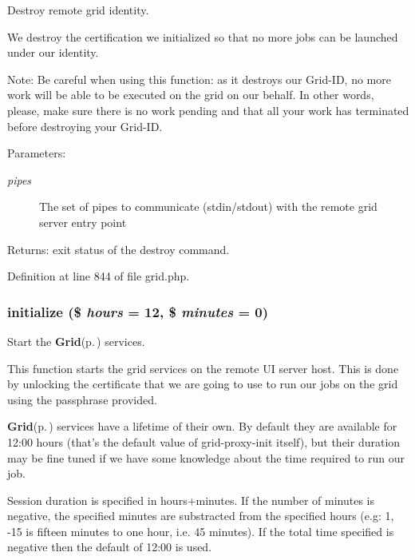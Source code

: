 Destroy remote grid identity. 

We destroy the certification we initialized so that no more jobs can be launched under our identity.

\begin{Desc}
\item[Note:]Be careful when using this function: as it destroys our Grid-ID, no more work will be able to be executed on the grid on our behalf. In other words, please, make sure there is no work pending and that all your work has terminated before destroying your Grid-ID.\end{Desc}
\begin{Desc}
\item[Parameters:]
\begin{description}
\item[{\em pipes}]The set of pipes to communicate (stdin/stdout) with the remote grid server entry point\end{description}
\end{Desc}
\begin{Desc}
\item[Returns:]exit status of the destroy command. \end{Desc}


Definition at line 844 of file grid.php.
\subsubsection{\setlength{\rightskip}{0pt plus 5cm}initialize (\$ {\em hours} = 12, \$ {\em minutes} = 0)}\label{grid_8php_a0}


Start the {\bf Grid}{\rm (p.\,\pageref{classGrid})} services. 

This function starts the grid services on the remote UI server host. This is done by unlocking the certificate that we are going to use to run our jobs on the grid using the passphrase provided.

{\bf Grid}{\rm (p.\,\pageref{classGrid})} services have a lifetime of their own. By default they are available for 12:00 hours (that's the default value of grid-proxy-init itself), but their duration may be fine tuned if we have some knowledge about the time required to run our job.

Session duration is specified in hours+minutes. If the number of minutes is negative, the specified minutes are substracted from the specified hours (e.g: 1, -15 is fifteen minutes to one hour, i.e. 45 minutes). If the total time specified is negative then the default of 12:00 is used.

